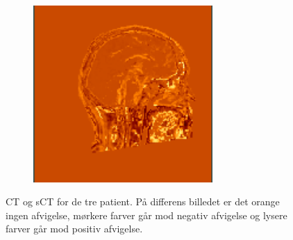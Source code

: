 \begin{figure}
\begin{subfigure}[b]{0.3\textwidth}
        \includegraphics[width=0.75\textwidth]{colager/over_tid_sct/over_tid_sct_210445_sub.png}
        \label{col:over_time_sct_pat3_sub}
    \end{subfigure}
    \caption{CT og sCT for de tre patient. På differens billedet er det orange ingen afvigelse, mørkere farver går mod negativ afvigelse og lysere farver går mod positiv afvigelse.}
    \label{col:over_time_sct}
\end{figure}

